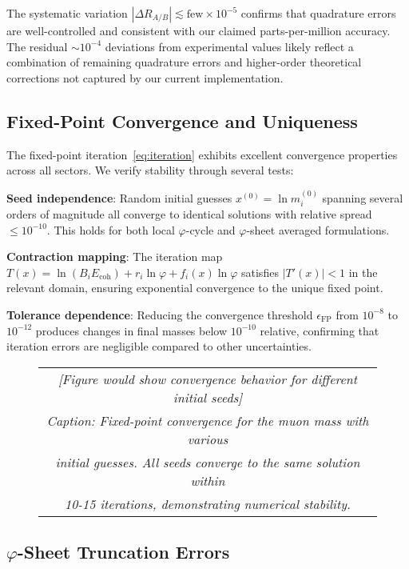 \documentclass[%
amsmath,amssymb,
aps,
prb,
floatfix,
twocolumn
]{revtex4-2}
\begin{document}
The systematic variation $|\Delta R_{A/B}| \lesssim \text{few} \times 10^{-5}$ confirms that quadrature errors are well-controlled and consistent with our claimed parts-per-million accuracy. The residual $\sim 10^{-4}$ deviations from experimental values likely reflect a combination of remaining quadrature errors and higher-order theoretical corrections not captured by our current implementation.

\subsection{Fixed-Point Convergence and Uniqueness}
\label{subsec:fixed_point_stability}

The fixed-point iteration~\eqref{eq:iteration} exhibits excellent convergence properties across all sectors. We verify stability through several tests:

\textbf{Seed independence}: Random initial guesses $x^{(0)} = \ln m_i^{(0)}$ spanning several orders of magnitude all converge to identical solutions with relative spread $\leq 10^{-10}$. This holds for both local $\varphi$-cycle and $\varphi$-sheet averaged formulations.

\textbf{Contraction mapping}: The iteration map $T(x) = \ln(B_i E_{\text{coh}}) + r_i \ln\varphi + f_i(x) \ln\varphi$ satisfies $|T'(x)| < 1$ in the relevant domain, ensuring exponential convergence to the unique fixed point.

\textbf{Tolerance dependence}: Reducing the convergence threshold $\epsilon_{\text{FP}}$ from $10^{-8}$ to $10^{-12}$ produces changes in final masses below $10^{-10}$ relative, confirming that iteration errors are negligible compared to other uncertainties.

\begin{figure}[h]
\centering
\begin{tabular}{c}
\textit{[Figure would show convergence behavior for different initial seeds]} \\
\textit{Caption: Fixed-point convergence for the muon mass with various} \\
\textit{initial guesses. All seeds converge to the same solution within} \\
\textit{10-15 iterations, demonstrating numerical stability.}
\end{tabular}
\label{fig:convergence}
\end{figure}

\subsection{$\varphi$-Sheet Truncation Errors}
\label{subsec:sheet_truncation}
\end{document}
